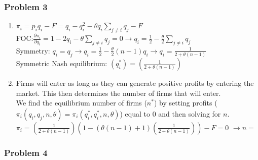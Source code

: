 \documentclass[a4paper]{article}
\begin{document}
\subsubsection{Problem 3}\label{problem3}
\begin{enumerate}[\textbf{(a)}]
\item
$\pi_i=p_iq_i-F=q_i-q_i^2-\theta q_i \sum\limits_{j\ne i} q_j-F$\\
FOC:$ \frac{\partial\pi_i}{\partial q_i}=1-2q_i-\theta\sum\limits_{j\ne i}q_j=0 \rightarrow q_i=\frac{1}{2}-\frac{\theta}{2}\sum\limits_{j \ne i}q_j$\\
Symmetry: $q_i=q_j \rightarrow q_i=\frac{1}{2}-\frac{\theta}{2}(n-1)q_i \rightarrow q_i=\frac{1}{2+\theta(n-1)}$
\\Symmetric Nash equilibrium: $(q_i^*)=(\frac{1}{2+\theta(n-1)})$
\item
Firms will enter as long as they can generate positive profits by entering the market. This then determines the number of firms that will enter.\\
We find the equilibrium number of firms ($n^*$) by setting profits ($\pi_i(q_i,q_j,n,\theta)=\pi_i(q_i^*,q_i^*,n,\theta)$) equal to $0$ and then solving for $n$.\\
$\pi_i=\left(\frac{1}{2+\theta(n-1)}\right)\left(1-(\theta(n-1)+1)\left(\frac{1}{2+\theta(n-1)}\right)\right)-F=0$
$\rightarrow n=$

\end{enumerate}

\subsubsection{Problem 4}\label{problem4}
\end{document}
